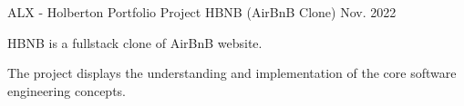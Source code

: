 \begin{cventries}
  \cventry
  {ALX - Holberton Portfolio Project} %
  {HBNB (AirBnB Clone) } %
  {} %
  {Nov. 2022} %
  {
    \begin{cvitems} %
      \item {HBNB is a fullstack clone of AirBnB website.}
      \item { The project displays the understanding and implementation of the
                  core software engineering concepts.}
    \end{cvitems}
  }
\end{cventries}

